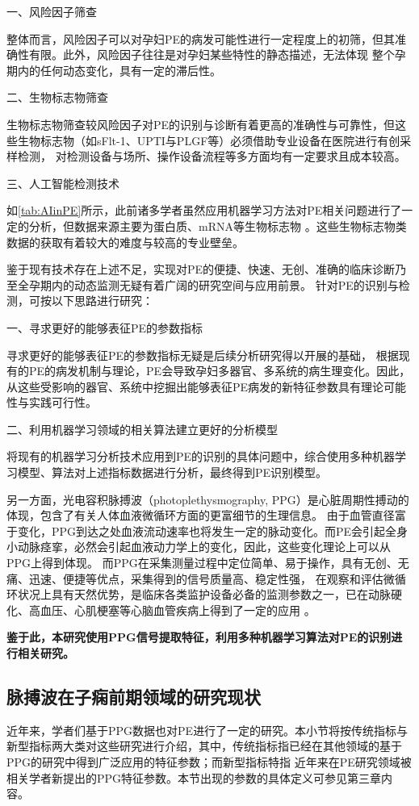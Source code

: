 一、风险因子筛查

整体而言，风险因子可以对孕妇PE的病发可能性进行一定程度上的初筛，但其准确性有限。此外，风险因子往往是对孕妇某些特性的静态描述，无法体现
整个孕期内的任何动态变化，具有一定的滞后性。

二、生物标志物筛查

生物标志物筛查较风险因子对PE的识别与诊断有着更高的准确性与可靠性，但这些生物标志物（如sFlt-1、UPTI与PLGF等）必须借助专业设备在医院进行有创采样检测，
对检测设备与场所、操作设备流程等多方面均有一定要求且成本较高。

三、人工智能检测技术

如\autoref{tab:AIinPE}所示，此前诸多学者虽然应用机器学习方法对PE相关问题进行了一定的分析，但数据来源主要为蛋白质、mRNA等生物标志物
。这些生物标志物类数据的获取有着较大的难度与较高的专业壁垒。

鉴于现有技术存在上述不足，实现对PE的便捷、快速、无创、准确的临床诊断乃至全孕期内的动态监测无疑有着广阔的研究空间与应用前景。
针对PE的识别与检测，可按以下思路进行研究：

一、寻求更好的能够表征PE的参数指标

寻求更好的能够表征PE的参数指标无疑是后续分析研究得以开展的基础，
根据现有的PE的病发机制与理论，PE会导致孕妇多器官、多系统的病生理变化。因此，从这些受影响的器官、系统中挖掘出能够表征PE病发的新特征参数具有理论可能性与实践可行性。

二、利用机器学习领域的相关算法建立更好的分析模型

将现有的机器学习分析技术应用到PE的识别的具体问题中，综合使用多种机器学习模型、算法对上述指标数据进行分析，最终得到PE识别模型。

另一方面，光电容积脉搏波（photoplethysmography, PPG）是心脏周期性搏动的体现，包含了有关人体血液微循环方面的更富细节的生理信息\cite{PPGYY}。
由于血管直径富于变化，PPG到达之处血液流动速率也将发生一定的脉动变化。而PE会引起全身小动脉痉挛，必然会引起血液动力学上的变化，因此，这些变化理论上可以从PPG上得到体现。
而PPG在采集测量过程中定位简单、易于操作，具有无创、无痛、迅速、便捷等优点，采集得到的信号质量高、稳定性强，
在观察和评估微循环状况上具有天然优势，是临床各类监护设备必备的监测参数之一，已在动脉硬化、高血压、心肌梗塞等心脑血管疾病上得到了一定的应用
\cite{PPGYY,Allen2007,THOCBPM,Zhang2010,ldl,lhc}。

\textbf{鉴于此，本研究使用PPG信号提取特征，利用多种机器学习算法对PE的识别进行相关研究。}

\subsection{脉搏波在子痫前期领域的研究现状}
近年来，学者们基于PPG数据也对PE进行了一定的研究。本小节将按传统指标与新型指标两大类对这些研究进行介绍，其中，传统指标指已经在其他领域的基于PPG的研究中得到广泛应用的特征参数；而新型指标特指
近年来在PE研究领域被相关学者新提出的PPG特征参数。本节出现的参数的具体定义可参见第三章内容。

